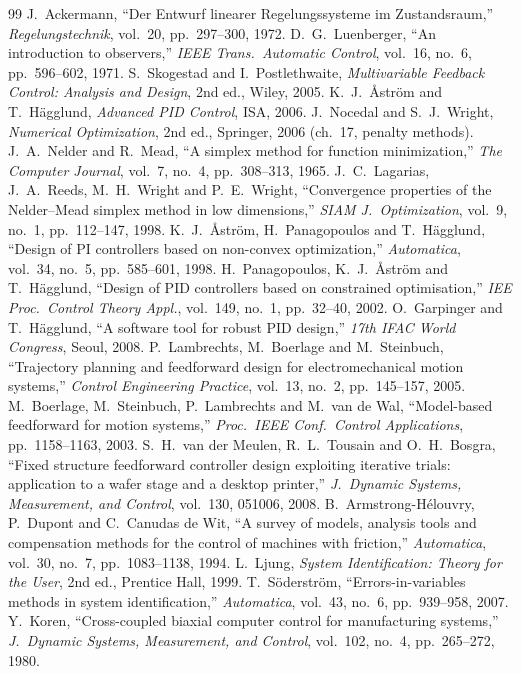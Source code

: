 \documentclass[10pt,a4paper]{article}
\begin{document}
\begin{thebibliography}{99}\small
\setlength{\itemsep}{1pt}
 J.~Ackermann, ``Der Entwurf linearer Regelungssysteme im Zustandsraum,'' \emph{Regelungstechnik}, vol.~20, pp.~297--300, 1972.
 D.~G.~Luenberger, ``An introduction to observers,'' \emph{IEEE Trans.\ Automatic Control}, vol.~16, no.~6, pp.~596--602, 1971.
 S.~Skogestad and I.~Postlethwaite, \emph{Multivariable Feedback Control: Analysis and Design}, 2nd ed., Wiley, 2005.
 K.~J.~\AA{}str\"om and T.~H\"agglund, \emph{Advanced PID Control}, ISA, 2006.
 J.~Nocedal and S.~J.~Wright, \emph{Numerical Optimization}, 2nd ed., Springer, 2006 (ch.~17, penalty methods).
 J.~A.~Nelder and R.~Mead, ``A simplex method for function minimization,'' \emph{The Computer Journal}, vol.~7, no.~4, pp.~308--313, 1965.
 J.~C.~Lagarias, J.~A.~Reeds, M.~H.~Wright and P.~E.~Wright, ``Convergence properties of the Nelder--Mead simplex method in low dimensions,'' \emph{SIAM J.\ Optimization}, vol.~9, no.~1, pp.~112--147, 1998.
 K.~J.~\AA{}str\"om, H.~Panagopoulos and T.~H\"agglund, ``Design of PI controllers based on non-convex optimization,'' \emph{Automatica}, vol.~34, no.~5, pp.~585--601, 1998.
 H.~Panagopoulos, K.~J.~\AA{}str\"om and T.~H\"agglund, ``Design of PID controllers based on constrained optimisation,'' \emph{IEE Proc.\ Control Theory Appl.}, vol.~149, no.~1, pp.~32--40, 2002.
 O.~Garpinger and T.~H\"agglund, ``A software tool for robust PID design,'' \emph{17th IFAC World Congress}, Seoul, 2008.
 P.~Lambrechts, M.~Boerlage and M.~Steinbuch, ``Trajectory planning and feedforward design for electromechanical motion systems,'' \emph{Control Engineering Practice}, vol.~13, no.~2, pp.~145--157, 2005.
 M.~Boerlage, M.~Steinbuch, P.~Lambrechts and M.~van de Wal, ``Model-based feedforward for motion systems,'' \emph{Proc.\ IEEE Conf.\ Control Applications}, pp.~1158--1163, 2003.
 S.~H.~van der Meulen, R.~L.~Tousain and O.~H.~Bosgra, ``Fixed structure feedforward controller design exploiting iterative trials: application to a wafer stage and a desktop printer,'' \emph{J.\ Dynamic Systems, Measurement, and Control}, vol.~130, 051006, 2008.
 B.~Armstrong-H\'elouvry, P.~Dupont and C.~Canudas de Wit, ``A survey of models, analysis tools and compensation methods for the control of machines with friction,'' \emph{Automatica}, vol.~30, no.~7, pp.~1083--1138, 1994.
 L.~Ljung, \emph{System Identification: Theory for the User}, 2nd ed., Prentice Hall, 1999.
 T.~S\"oderstr\"om, ``Errors-in-variables methods in system identification,'' \emph{Automatica}, vol.~43, no.~6, pp.~939--958, 2007.
 Y.~Koren, ``Cross-coupled biaxial computer control for manufacturing systems,'' \emph{J.\ Dynamic Systems, Measurement, and Control}, vol.~102, no.~4, pp.~265--272, 1980.
\end{thebibliography}
\end{document}
